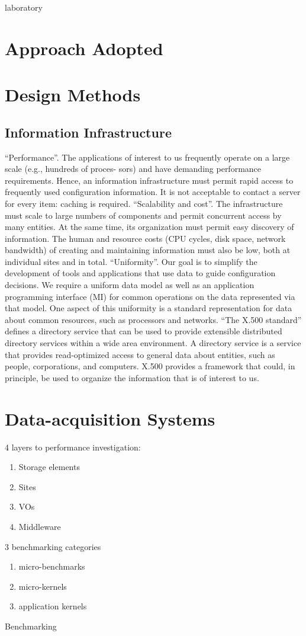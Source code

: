 laboratory

\section{Approach Adopted}
\section{Design Methods}

\subsection{Information Infrastructure}
``Performance''.  The applications of interest to us frequently 
operate on  a  large scale  (e.g.,  hundreds  of  proces- 
sors) and have demanding performance requirements. 
Hence, an information infrastructure must permit rapid 
access to frequently used configuration information. It 
is not acceptable to contact  a  server  for every  item: 
caching is required.
``Scalability and cost''. The infrastructure must scale to large
numbers of components and permit concurrent access
by many entities. At the same time, its organization
must permit easy discovery of information. The human
and resource costs (CPU cycles, disk space, network
bandwidth) of creating and maintaining information
must also be low, both at individual sites and in total.
``Uniformity''. Our goal is to simplify the development of
tools and applications that use data to guide configuration
decisions. We require a uniform data model
as well as an application programming interface (MI)
for common operations on the data represented via that
model. One aspect of this uniformity is a standard representation
for data about common resources, such as
processors and networks.
``The X.500 standard'' defines a directory service
that can be used to provide extensible distributed directory
services within a wide area environment. A directory service
is a service that provides read-optimized access to general
data about entities, such as people, corporations, and computers.
X.500 provides a framework that could, in principle,
be used to organize the information that is of interest to us.
\cite{mds1}


\section{Data-acquisition Systems}
4 layers to performance investigation:
\begin{enumerate}
  \item Storage elements
  \item Sites
  \item VOs
  \item Middleware
\end{enumerate}
3 benchmarking categories
\begin{enumerate}
  \item micro-benchmarks
  \item micro-kernels
  \item application kernels
\end{enumerate}
Benchmarking

